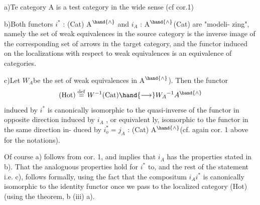 
a)\quad Te category A is a test category in the wide sense (cf cor.1)

b)\quad Both functors $i^*$ : (Cat)\hand{\ensuremath{\longrightarrow}} A$^{\hand{\wedge}}$ and $i_A$ : A$^{\hand{\wedge}}$\hand{\ensuremath{\longrightarrow}}(Cat) are "modeli-%
zing", namely the set of weak equivalences in the source category
is the inverse image of the corresponding set of arrows in the
target category, and the functor induced on the localizations
with respect to weak equivalences is an equivalence of categories.

c)\quad Let \hand{(}$W_A$\hand{)}be the set of weak equivalences in A$^{\hand{\wedge}}$). Then the functor
\[ (\mathrm{Hot}) \overset{\mathrm{def}}{=} W^{-1}(\mathrm{Cat}) \hand{\ensuremath{\longrightarrow}} W_A{}^{-1}A^{\hand{\wedge}} \]
induced by $i^*$ is canonically isomorphic to the quasi-inverse
of the functor in opposite direction induced by $i_A$ , or equivalent%
ly,  isomorphic to the functor in the same direction in-%
duced by $i_o^* = j_A$ : (Cat)\hand{\ensuremath{\longrightarrow}} A$^{\hand{\wedge}}$(cf. again cor. 1 above for 
the notations).

Of course a) follows from cor. 1, and implies that $i_A$ has the
properties stated in b). That the analoguous properties hold for $i^*$ to,
and the rest of the statement i.e. c), follows formally, using the fact
that the compositum $i_Ai^*$ is canonically isomorphic to the identity functor
once we pass to the localized category (Hot) (using the theorem,
b (iii) \hand{\ensuremath{\Rightarrow}} a)\hand{)}.

